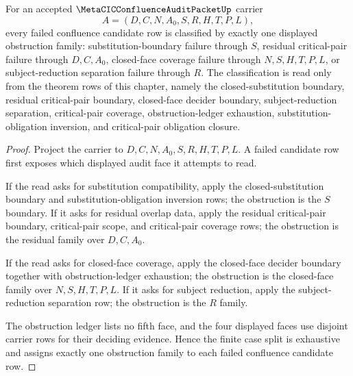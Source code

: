 \begin{theorem}
\label{thm:metacic-confluence-audit-packet-candidate-obstruction-classifier}
For an accepted $\MetaCICConfluenceAuditPacketUp$ carrier
$$
A=(D,C,N,A_0,S,R,H,T,P,L),
$$
every failed confluence candidate row is classified by exactly one displayed obstruction family: substitution-boundary failure through $S$, residual critical-pair failure through $D,C,A_0$, closed-face coverage failure through $N,S,H,T,P,L$, or subject-reduction separation failure through $R$. The classification is read only from the theorem rows of this chapter, namely the closed-substitution boundary, residual critical-pair boundary, closed-face decider boundary, subject-reduction separation, critical-pair coverage, obstruction-ledger exhaustion, substitution-obligation inversion, and critical-pair obligation closure.
\end{theorem}
\begin{proof}
Project the carrier to $D,C,N,A_0,S,R,H,T,P,L$. A failed candidate row first exposes which displayed audit face it attempts to read.

If the read asks for substitution compatibility, apply the closed-substitution boundary and substitution-obligation inversion rows; the obstruction is the $S$ boundary. If it asks for residual overlap data, apply the residual critical-pair boundary, critical-pair scope, and critical-pair coverage rows; the obstruction is the residual family over $D,C,A_0$.

If the read asks for closed-face coverage, apply the closed-face decider boundary together with obstruction-ledger exhaustion; the obstruction is the closed-face family over $N,S,H,T,P,L$. If it asks for subject reduction, apply the subject-reduction separation row; the obstruction is the $R$ family.

The obstruction ledger lists no fifth face, and the four displayed faces use disjoint carrier rows for their deciding evidence. Hence the finite case split is exhaustive and assigns exactly one obstruction family to each failed confluence candidate row.
\end{proof}

